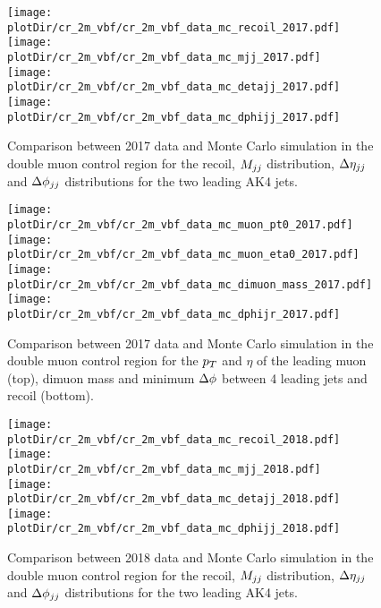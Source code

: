 \begin{figure}[htbp]
    \begin{center}
        \texttt{[image: \\plotDir/cr\_2m\_vbf/cr\_2m\_vbf\_data\_mc\_recoil\_2017.pdf]}
        \texttt{[image: \\plotDir/cr\_2m\_vbf/cr\_2m\_vbf\_data\_mc\_mjj\_2017.pdf]} \\
        \texttt{[image: \\plotDir/cr\_2m\_vbf/cr\_2m\_vbf\_data\_mc\_detajj\_2017.pdf]}
        \texttt{[image: \\plotDir/cr\_2m\_vbf/cr\_2m\_vbf\_data\_mc\_dphijj\_2017.pdf]}
    \end{center}
    \caption{Comparison between 2017 data and Monte Carlo simulation in the double muon control region for
        the recoil, $M_{jj}$ distribution, $\Delta \eta_{jj}$ and $\Delta \phi_{jj}$ distributions for the two leading AK4 jets.}
    \label{fig:cr_2m_vbf_2017_mtr}
\end{figure}

\begin{figure}[htbp]
    \begin{center}
        \texttt{[image: \\plotDir/cr\_2m\_vbf/cr\_2m\_vbf\_data\_mc\_muon\_pt0\_2017.pdf]}
        \texttt{[image: \\plotDir/cr\_2m\_vbf/cr\_2m\_vbf\_data\_mc\_muon\_eta0\_2017.pdf]}
        \texttt{[image: \\plotDir/cr\_2m\_vbf/cr\_2m\_vbf\_data\_mc\_dimuon\_mass\_2017.pdf]}
        \texttt{[image: \\plotDir/cr\_2m\_vbf/cr\_2m\_vbf\_data\_mc\_dphijr\_2017.pdf]}
    \end{center}
    \caption{Comparison between 2017 data and Monte Carlo simulation in the double muon control region for
        the $p_T$ and $\eta$ of the leading muon (top), dimuon mass and minimum $\Delta \phi$ between 4 leading jets and recoil (bottom).}
    \label{fig:cr_2m_vbf_2017_mtr_2}
\end{figure}

\begin{figure}[htbp]
    \begin{center}
        \texttt{[image: \\plotDir/cr\_2m\_vbf/cr\_2m\_vbf\_data\_mc\_recoil\_2018.pdf]}
        \texttt{[image: \\plotDir/cr\_2m\_vbf/cr\_2m\_vbf\_data\_mc\_mjj\_2018.pdf]} \\
        \texttt{[image: \\plotDir/cr\_2m\_vbf/cr\_2m\_vbf\_data\_mc\_detajj\_2018.pdf]}
        \texttt{[image: \\plotDir/cr\_2m\_vbf/cr\_2m\_vbf\_data\_mc\_dphijj\_2018.pdf]}
    \end{center}
    \caption{Comparison between 2018 data and Monte Carlo simulation in the double muon control region for
        the recoil, $M_{jj}$ distribution, $\Delta \eta_{jj}$ and $\Delta \phi_{jj}$ distributions for the two leading AK4 jets.}
    \label{fig:cr_2m_vbf_2018_mtr}
\end{figure}

